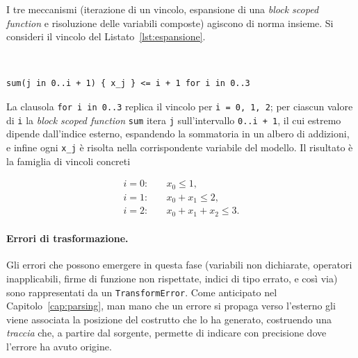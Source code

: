I tre meccanismi (iterazione di un vincolo, espansione di una \emph{block scoped
function} e risoluzione delle variabili composte) agiscono di norma insieme. Si
consideri il vincolo del Listato~\ref{lst:espansione}.

\
 
\begin{lstlisting}[caption={Un vincolo che combina iterazione, sommatoria con \emph{scope} e variabili composte.}, label={lst:espansione}]
sum(j in 0..i + 1) { x_j } <= i + 1 for i in 0..3
\end{lstlisting}

La clausola \texttt{for i in 0..3} replica il vincolo per \texttt{i = 0, 1, 2}; per
ciascun valore di \texttt{i} la \emph{block scoped function} \texttt{sum} itera
\texttt{j} sull'intervallo \texttt{0..i + 1}, il cui estremo dipende dall'indice
esterno, espandendo la sommatoria in un albero di addizioni, e infine ogni
\texttt{x\_j} è risolta nella corrispondente variabile del modello. Il risultato è
la famiglia di vincoli concreti

\begin{equation*}
\begin{aligned}
i = 0:\quad & x_0 \le 1, \\
i = 1:\quad & x_0 + x_1 \le 2, \\
i = 2:\quad & x_0 + x_1 + x_2 \le 3.
\end{aligned}
\end{equation*}

\paragraph{Errori di trasformazione.}
Gli errori che possono emergere in questa fase (variabili non dichiarate,
operatori inapplicabili, firme di funzione non rispettate, indici di tipo errato,
e così via) sono rappresentati da un \texttt{TransformError}. Come anticipato nel
Capitolo~\ref{cap:parsing}, man mano che un errore si propaga verso l'esterno gli
viene associata la posizione del costrutto che lo ha generato, costruendo una
\emph{traccia} che, a partire dal sorgente, permette di indicare con precisione
dove l'errore ha avuto origine.
